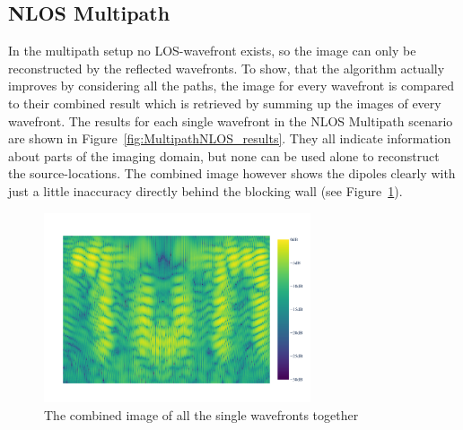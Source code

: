 \subsection{NLOS Multipath}
In the multipath setup no LOS-wavefront exists, so the image can only be reconstructed by the reflected wavefronts.
To show, that the algorithm actually improves by considering all the paths, the image for every wavefront is compared to their combined result which is retrieved by summing up the images of every wavefront.
The results for each single wavefront in the NLOS Multipath scenario are shown in Figure~\ref{fig:MultipathNLOS_results}.
They all indicate information about parts of the imaging domain, but none can be used alone to reconstruct the source-locations.
The combined image however shows the dipoles clearly with just a little inaccuracy directly behind the blocking wall (see Figure~\ref{fig:MultipathNLOS_combined}).

\begin{figure}[hp]
    \centering
    \includegraphics[page=1, width=0.7\textwidth]{figures/multipath_nlos_combined.pdf}
    \caption{The combined image of all the single wavefronts together}\label{fig:MultipathNLOS_combined}
\end{figure}

